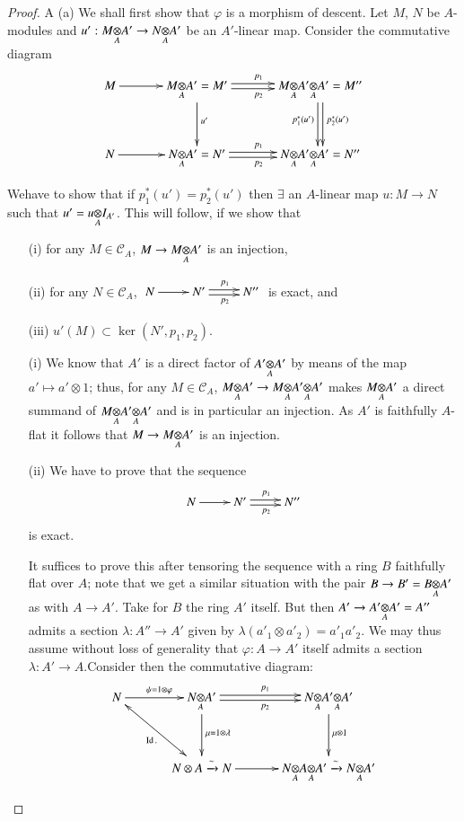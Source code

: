 \begin{proof}
A (a) We shall first show that $\varphi$ is a morphism of descent. Let
$M$, $N$ be $A$-modules and $u':\foprod{M}{A'}{A}\to \foprod{N}{A'}{A}$
be an $A'$-linear map. Consider the commutative diagram
\[
\xymatrix@=1.2cm{
M\ar[r] &
\foprod{M}{A'}{A}=M'\ar[d]^{u'}\ar@<.2em>[r]^{p_{1}}\ar@<-.2em>[r]_{p_{2}} 
 &
\foprod{M}{\foprod{A'}{A'}{A}}{A}=M''\ar@<.2em>[d]^{p^{\ast}_{2}(u')}\ar@<-.2em>[d]_{p^{\ast}_{1}(u')}\\
N\ar[r] &
\foprod{N}{A'}{A}=N'\ar@<.2em>[r]^{p_{1}}\ar@<-.2em>[r]_{p_{2}} &
\foprod{N}{\foprod{A'}{A'}{A}}{A}=N'' 
}
\]

We\pageoriginale have to show that if
$p^{\ast}_{1}(u')=p^{\ast}_{2}(u')$ then $\exists$ an $A$-linear map
  $u:M\to N$ such that $u'=\foprod{u}{I_{A'}}{A}$. This will follow,
  if we show that
\begin{itemize}
\item[(i)] for any $M\in\mathscr{C}_{A}$, $M\to \foprod{M}{A'}{A}$ is
  an injection,

\item[(ii)] for any $N\in\mathscr{C}_{A}$, $\xymatrix{N\ar[r] &
  N'\ar@<.2em>[r]^{p_{1}}\ar@<-.2em>[r]_{p_{2}} & N''}$ is exact, and

\item[(iii)] $u'(M)\subset \ker (N',p_{1},p_{2})$.
\end{itemize}

\begin{itemize}
\item[(i)] We know that $A'$ is a direct factor of
  $\foprod{A'}{A'}{A}$ by means of the map $a'\mapsto a'\otimes 1$;
  thus, for any $M\in \mathscr{C}_{A}$, $\foprod{M}{A'}{A}\to
  \foprod{M}{\foprod{A'}{A'}{A}}{A}$ makes $\foprod{M}{A'}{A}$ a
  direct summand of $\foprod{M}{\foprod{A'}{A'}{A}}{A}$ and is in
  particular an injection. As $A'$ is faithfully $A$-flat it follows
  that $M\to \foprod{M}{A'}{A}$ is an injection.

\item[(ii)] We have to prove that the sequence
\[
\xymatrix{
N\ar[r] & N'\ar@<.2em>[r]^{p_{1}}\ar@<-.2em>[r]_{p_{2}} & N''
}
\]
is exact.


It suffices to prove this after tensoring the sequence with a ring $B$
faithfully flat over $A$; note that we get a similar situation with
the pair $B\to B'=\foprod{B}{A'}{A}$ as with $A\to A'$. Take for $B$
the ring $A'$ itself. But then $A'\to \foprod{A'}{A'}{A}=A''$ admits a
section $\lambda:A''\to A'$ given by $\lambda(a'_{1}\otimes
a'_{2})=a'_{1}a'_{2}$. We may thus assume without loss of generality
that $\varphi:A\to A'$ itself admits a section $\lambda:A'\to
A$.\pageoriginale Consider then the commutative diagram:
\[
\xymatrix@=1.2cm{
N\ar[r]^{\psi=1\otimes \varphi}\ar@{<->}_{\Id.}[dr] &
\foprod{N}{A'}{A}\ar[d]^{\mu =1\otimes
  \lambda}\ar@<.2em>[r]^{p_{1}}\ar@<-.2em>[r]_{p_{2}} &
\foprod{N}{\foprod{A'}{A'}{A}}{A}\ar[d]^{\mu\otimes 1}\\
 & N\otimes A\xrightarrow{\sim}N\ar[r] &
\foprod{N}{\foprod{A}{A'}{A}}{A}\xrightarrow{\sim}\foprod{N}{A'}{A}  
}
\]


\end{itemize}
\end{proof}
